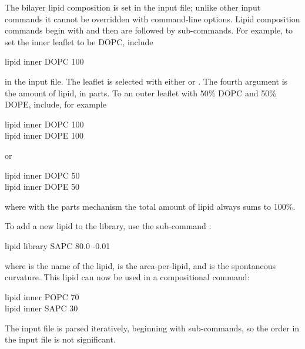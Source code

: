 
 \label{sec:lipid_comp}

The bilayer lipid composition is set in the input file; unlike other input commands it cannot be overridden with command-line options.
Lipid composition commands begin with  and then are followed by sub-commands.
For example, to set the inner leaflet to be DOPC, include
\begin{icommand}
lipid inner DOPC 100
\end{icommand}
in the input file.
The leaflet is selected with either  or . 
The fourth argument is the amount of lipid, in parts.
To an outer leaflet with 50\% DOPC and 50\% DOPE, include, for example 
\begin{icommand}
lipid inner DOPC 100 \\
lipid inner DOPE 100
\end{icommand}
or
\begin{icommand}
lipid inner DOPC 50 \\
lipid inner DOPE 50
\end{icommand}
where with the parts mechanism the total amount of lipid always sums to 100\%.

To add a new lipid to the library, use the sub-command :
\begin{icommand}
lipid library SAPC 80.0 -0.01
\end{icommand}
where  is the name of the lipid,  is the area-per-lipid, and  is the spontaneous curvature.
This lipid can now be used in a compositional command:
\begin{icommand}
lipid inner POPC 70 \\
lipid inner SAPC 30
\end{icommand}
The input file is parsed iteratively, beginning with  sub-commands, so the order in the input file is not significant.



%
%
%



